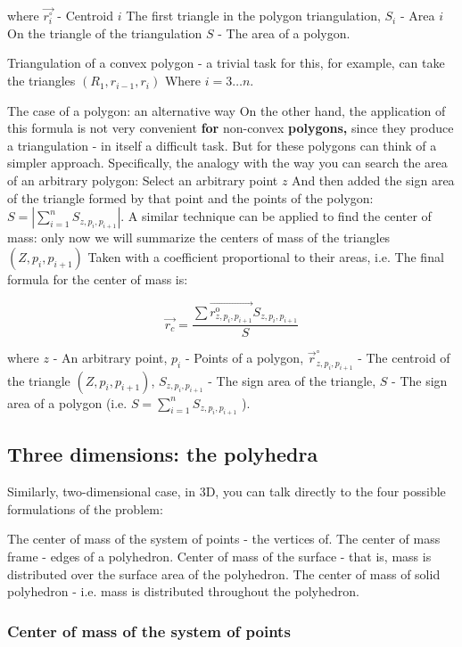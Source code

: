 where $\vec {r_i ^ \circ}$ - Centroid $i$ The first triangle in the polygon triangulation, $S_i$ - Area $i$ On the triangle of the triangulation $S$ - The area of ​​a polygon.

Triangulation of a convex polygon - a trivial task for this, for example, can take the triangles $(R_1, r_ {i-1}, r_i)$ Where $i = 3 \ldots n$.

The case of a polygon: an alternative way
On the other hand, the application of this formula is not very convenient \textbf{for} non-convex \textbf{polygons,} since they produce a triangulation - in itself a difficult task. But for these polygons can think of a simpler approach. Specifically, the analogy with the way you can search the area of ​​an arbitrary polygon: Select an arbitrary point $z$ And then added the sign area of ​​the triangle formed by that point and the points of the polygon: $S = | \sum_ {i = 1} ^ n S_ {z, p_i, p_ {i +1}} |$. A similar technique can be applied to find the center of mass: only now we will summarize the centers of mass of the triangles $(Z, p_i, p_ {i +1})$ Taken with a coefficient proportional to their areas, i.e. The final formula for the center of mass is:

$$\vec{r_{c}}=\frac{\sum\vec{r_{z,p_{i},p_{i+1}}^{\text{o}}}S_{z,p_{i},p_{i+1}}}{S}$$

where $z$ - An arbitrary point, $p_i$ - Points of a polygon, ${\Vec r} _ {z, p_i, p_ {i +1}} ^ \circ$ - The centroid of the triangle $(Z, p_i, p_ {i +1})$, $S_ {z, p_i, p_ {i +1}}$ - The sign area of ​​the triangle, $S$ - The sign area of ​​a polygon (i.e. $S = \sum_ {i = 1} ^ {n} S_ {z, p_i, p_ {i +1}}$ ).

\subsection{ Three dimensions: the polyhedra }

Similarly, two-dimensional case, in 3D, you can talk directly to the four possible formulations of the problem:

The center of mass of the system of points - the vertices of.
The center of mass frame - edges of a polyhedron.
Center of mass of the surface - that is, mass is distributed over the surface area of ​​the polyhedron.
The center of mass of solid polyhedron - i.e. mass is distributed throughout the polyhedron.
\subsubsection{ Center of mass of the system of points }


